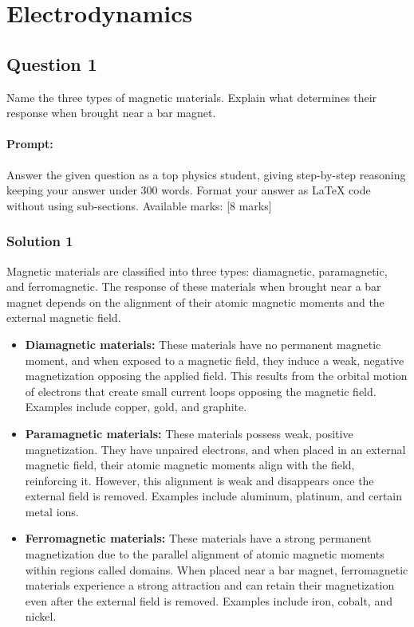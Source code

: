 \documentclass{article}
\begin{document}
\section{Electrodynamics}

\subsection{Question 1}

Name the three types of magnetic materials. Explain what determines their response when brought near a bar magnet. 

\paragraph{Prompt: \\} 
Answer the given question as a top physics student, giving step-by-step reasoning keeping your answer under 300 words. Format your answer as LaTeX code without using sub-sections. Available marks: [8 marks]

\subsubsection{Solution 1}

Magnetic materials are classified into three types: diamagnetic, paramagnetic, and ferromagnetic. The response of these materials when brought near a bar magnet depends on the alignment of their atomic magnetic moments and the external magnetic field.

\begin{itemize}
    \item \textbf{Diamagnetic materials:} These materials have no permanent magnetic moment, and when exposed to a magnetic field, they induce a weak, negative magnetization opposing the applied field. This results from the orbital motion of electrons that create small current loops opposing the magnetic field. Examples include copper, gold, and graphite.
    \item \textbf{Paramagnetic materials:} These materials possess weak, positive magnetization. They have unpaired electrons, and when placed in an external magnetic field, their atomic magnetic moments align with the field, reinforcing it. However, this alignment is weak and disappears once the external field is removed. Examples include aluminum, platinum, and certain metal ions.
    \item \textbf{Ferromagnetic materials:} These materials have a strong permanent magnetization due to the parallel alignment of atomic magnetic moments within regions called domains. When placed near a bar magnet, ferromagnetic materials experience a strong attraction and can retain their magnetization even after the external field is removed. Examples include iron, cobalt, and nickel.
\end{itemize}
\end{document}
